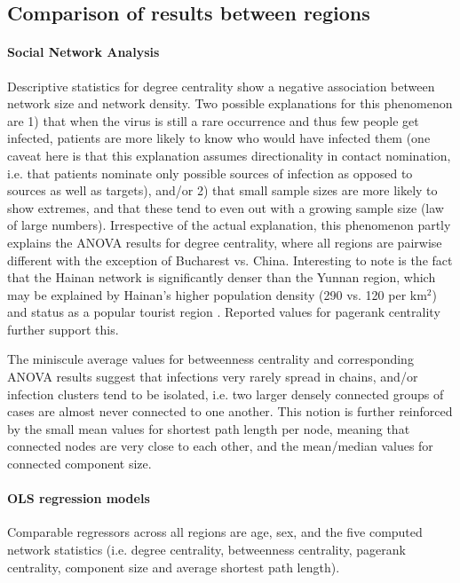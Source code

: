 \subsection{Comparison of results between regions}
\label{sec:discussion_regions}

\paragraph{Social Network Analysis} Descriptive statistics for degree centrality show a negative association between network size and network density. Two possible explanations for this phenomenon are 1) that when the virus is still a rare occurrence and thus few people get infected, patients are more likely to know who would have infected them (one caveat here is that this explanation assumes directionality in contact nomination, i.e. that patients nominate only possible sources of infection as opposed to sources as well as targets), and/or 2) that small sample sizes are more likely to show extremes, and that these tend to even out with a growing sample size (law of large numbers). Irrespective of the actual explanation, this phenomenon partly explains the ANOVA results for degree centrality, where all regions are pairwise different with the exception of Bucharest vs. China. Interesting to note is the fact that the Hainan network is significantly denser than the Yunnan region, which may be explained by Hainan's higher population density (290 vs. 120 per km$^2$) and status as a popular tourist region \cite{wiki_yunnan,wiki_hainan}. Reported values for pagerank centrality further support this.

The miniscule average values for betweenness centrality and corresponding ANOVA results suggest that infections very rarely spread in chains, and/or infection clusters tend to be isolated, i.e. two larger densely connected groups of cases are almost never connected to one another. This notion is further reinforced by the small mean values for shortest path length per node, meaning that connected nodes are very close to each other, and the mean/median values for connected component size.

\paragraph{OLS regression models} Comparable regressors across all regions are age, sex, and the five computed network statistics (i.e. degree centrality, betweenness centrality, pagerank centrality, component size and average shortest path length). 

